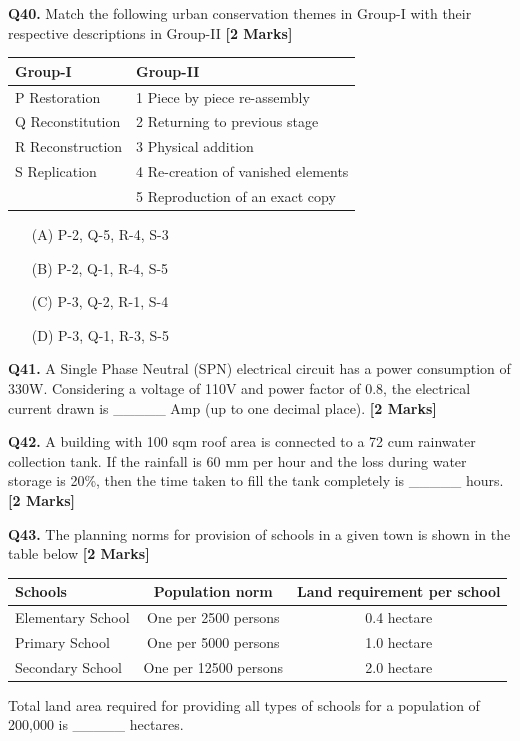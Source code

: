 \documentclass[11pt]{article}
\newcommand{\questionb}[2]{
    \noindent\textbf{Q#2.} #1 \hfill \textbf{[2 Marks]}
}
\begin{document}
\questionb{Match the following urban conservation themes in Group-I with their respective descriptions in Group-II}{40}
\begin{tabularx}{\textwidth}{|l|X|}
\hline
\textbf{Group-I} & \textbf{Group-II} \\
\hline
P Restoration & 1 Piece by piece re-assembly \\
Q Reconstitution & 2 Returning to previous stage \\
R Reconstruction & 3 Physical addition \\
S Replication & 4 Re-creation of vanished elements \\
 & 5 Reproduction of an exact copy \\
\hline
\end{tabularx}
\begin{enumerate}
    \item[(A)] P-2, Q-5, R-4, S-3
    \item[(B)] P-2, Q-1, R-4, S-5
    \item[(C)] P-3, Q-2, R-1, S-4
    \item[(D)] P-3, Q-1, R-3, S-5
\end{enumerate}
\vspace{0.5cm}

\questionb{A Single Phase Neutral (SPN) electrical circuit has a power consumption of 330W. Considering a voltage of 110V and power factor of 0.8, the electrical current drawn is \_\_\_\_\_ Amp (up to one decimal place).}{41}
\vspace{0.5cm}

\questionb{A building with 100 sqm roof area is connected to a 72 cum rainwater collection tank. If the rainfall is 60 mm per hour and the loss during water storage is 20\%, then the time taken to fill the tank completely is \_\_\_\_\_ hours.}{42}
\vspace{0.5cm}

\questionb{The planning norms for provision of schools in a given town is shown in the table below}{43}
\begin{center}
\begin{tabular}{|l|c|c|}
\hline
\textbf{Schools} & \textbf{Population norm} & \textbf{Land requirement per school} \\
\hline
Elementary School & One per 2500 persons & 0.4 hectare \\
Primary School & One per 5000 persons & 1.0 hectare \\
Secondary School & One per 12500 persons & 2.0 hectare \\
\hline
\end{tabular}
\end{center}
Total land area required for providing all types of schools for a population of 200,000 is \_\_\_\_\_ hectares.
\vspace{0.5cm}
\end{document}
